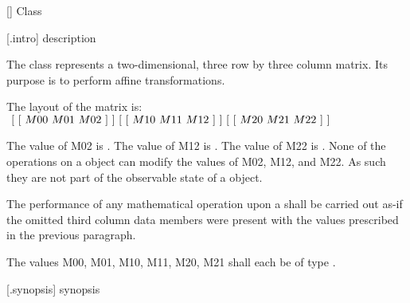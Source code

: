  [\matrixtwod] {Class }

 [\matrixtwod.intro] { description}

\pnum
The  class represents a two-dimensional, three row by three column matrix. Its purpose is to perform affine transformations.

\pnum
The layout of the matrix is: \\
$
~[~[~M00~M01~M02~]~] \\
~[~[~M10~M11~M12~]~] \\
~[~[~M20~M21~M22~]~]$

\pnum
The value of M02 is . The value of M12 is . The value of M22 is . None of the operations on a  object can modify the values of M02, M12, and M22. As such they are not part of the observable state of a  object.

\pnum
The performance of any mathematical operation upon a  shall be carried out as-if the omitted third column data members were present with the values prescribed in the previous paragraph.

\pnum
The values M00, M01, M10, M11, M20, M21 shall each be of type .

 [\matrixtwod.synopsis] { synopsis}

